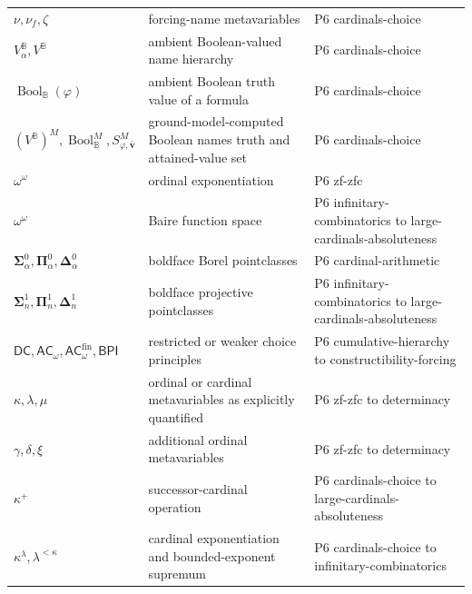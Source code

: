 \begin{longtable}{@{}p{}p{}p{}@{}}
\(\nu,\allowbreak \nu_f,\allowbreak \zeta\) & forcing-name metavariables & P6 cardinals-\allowbreak{}choice \\
\(V^{\mathbb B}_\alpha,\allowbreak V^{\mathbb B}\) & ambient Boolean-valued name hierarchy & P6 cardinals-\allowbreak{}choice \\
\(\operatorname{Bool}_{\mathbb B}(\varphi)\) & ambient Boolean truth value of a formula & P6 cardinals-\allowbreak{}choice \\
\((V^{\mathbb B})^M,\allowbreak \operatorname{Bool}_{\mathbb B}^M,\allowbreak S_{\varphi,\bar{\mathbf v}}^M\) & ground-model-computed Boolean names truth and attained-value set & P6 cardinals-\allowbreak{}choice \\
\(\omega^\omega\) & ordinal exponentiation & P6 zf-\allowbreak{}zfc \\
\(\omega^\omega\) & Baire function space & P6 infinitary-\allowbreak{}combinatorics to large-\allowbreak{}cardinals-\allowbreak{}absoluteness \\
\(\boldsymbol{\Sigma}^{0}_{\alpha},\allowbreak \boldsymbol{\Pi}^{0}_{\alpha},\allowbreak \boldsymbol{\Delta}^{0}_{\alpha}\) & boldface Borel pointclasses & P6 cardinal-\allowbreak{}arithmetic \\
\(\boldsymbol{\Sigma}^{1}_{n},\allowbreak \boldsymbol{\Pi}^{1}_{n},\allowbreak \boldsymbol{\Delta}^{1}_{n}\) & boldface projective pointclasses & P6 infinitary-\allowbreak{}combinatorics to large-\allowbreak{}cardinals-\allowbreak{}absoluteness \\
\(\mathsf{DC},\allowbreak \mathsf{AC}_{\omega},\allowbreak \mathsf{AC}_{\omega}^{\mathrm{fin}},\allowbreak \mathsf{BPI}\) & restricted or weaker choice principles & P6 cumulative-\allowbreak{}hierarchy to constructibility-\allowbreak{}forcing \\
\(\kappa,\allowbreak \lambda,\allowbreak \mu\) & ordinal or cardinal metavariables as explicitly quantified & P6 zf-\allowbreak{}zfc to determinacy \\
\(\gamma,\allowbreak \delta,\allowbreak \xi\) & additional ordinal metavariables & P6 zf-\allowbreak{}zfc to determinacy \\
\(\kappa^+\) & successor-cardinal operation & P6 cardinals-\allowbreak{}choice to large-\allowbreak{}cardinals-\allowbreak{}absoluteness \\
\(\kappa^\lambda,\allowbreak \lambda^{<\kappa}\) & cardinal exponentiation and bounded-exponent supremum & P6 cardinals-\allowbreak{}choice to infinitary-\allowbreak{}combinatorics \\

\end{longtable}
